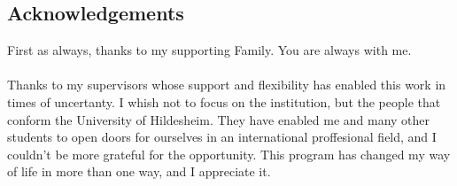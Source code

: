 \documentclass[a4paper,12pt]{report}
\begin{document}
\newpage

\begin{center}
\section*{Acknowledgements}\label{sec:Acknowledgements}
\end{center}
First as always, thanks to my supporting Family. You are always with me.\\
\\
Thanks to my supervisors whose support and flexibility has enabled this work in times of uncertanty.
I whish not to focus on the institution, but the people that conform the University of Hildesheim. They have enabled me and many other students to open doors for ourselves in an international proffesional field, and I couldn't be more grateful for the opportunity. This program has changed my way of life in more than one way, and I appreciate it.

\vfill


\newpage

\tableofcontents
\listoffigures
\listoftables
\lstlistoflistings
\newpage
{}

 
 
 
 
 
 



\end{document}
